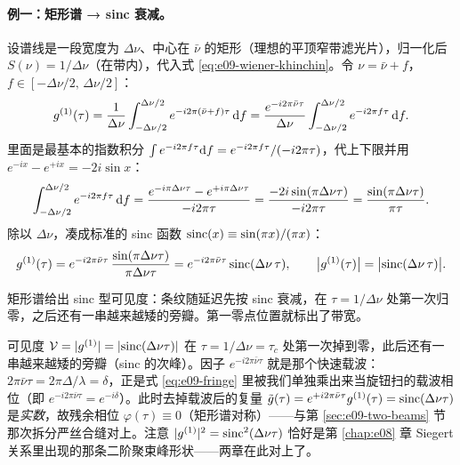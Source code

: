 \paragraph{例一：矩形谱 → sinc 衰减。}设谱线是一段宽度为 \(\Delta\nu\)、中心在 \(\bar\nu\) 的矩形（理想的平顶窄带滤光片），归一化后 \(S(\nu)=1/\Delta\nu\)（在带内），代入式 \eqref{eq:e09-wiener-khinchin}。令 \(\nu=\bar\nu+f\)，\(f\in[-\Delta\nu/2,\,\Delta\nu/2]\)：
\[
  g^{(1)}(\tau)=\frac{1}{\Delta\nu}\int_{-\Delta\nu/2}^{\Delta\nu/2}
  e^{-i2\pi(\bar\nu+f)\tau}\,{\rm d}f
  =\frac{e^{-i2\pi\bar\nu\tau}}{\Delta\nu}
  \int_{-\Delta\nu/2}^{\Delta\nu/2}e^{-i2\pi f\tau}\,{\rm d}f .
\]
里面是最基本的指数积分 \(\int e^{-i2\pi f\tau}{\rm d}f=e^{-i2\pi f\tau}/(-i2\pi\tau)\)，代上下限并用 \(e^{-ix}-e^{+ix}=-2i\sin x\)：
\[
  \int_{-\Delta\nu/2}^{\Delta\nu/2}e^{-i2\pi f\tau}\,{\rm d}f
  =\frac{e^{-i\pi\Delta\nu\tau}-e^{+i\pi\Delta\nu\tau}}{-i2\pi\tau}
  =\frac{-2i\sin(\pi\Delta\nu\tau)}{-i2\pi\tau}
  =\frac{\sin(\pi\Delta\nu\tau)}{\pi\tau} .
\]
除以 \(\Delta\nu\)，凑成标准的 sinc 函数 \({\rm sinc}(x)\equiv\sin(\pi x)/(\pi x)\)：
\begin{equation}
  g^{(1)}(\tau)=e^{-i2\pi\bar\nu\tau}\,\frac{\sin(\pi\Delta\nu\tau)}{\pi\Delta\nu\tau}
  =e^{-i2\pi\bar\nu\tau}\,{\rm sinc}(\Delta\nu\,\tau),
  \qquad
  \big|g^{(1)}(\tau)\big|=\big|{\rm sinc}(\Delta\nu\,\tau)\big| .
  \label{eq:e09-rect-sinc}
\end{equation}
\begin{formulaexplain}
矩形谱给出 sinc 型可见度：条纹随延迟先按 sinc 衰减，在 \(\tau=1/\Delta\nu\) 处第一次归零，之后还有一串越来越矮的旁瓣。第一零点位置就标出了带宽。
\end{formulaexplain}
可见度 \(\mathcal V=|g^{(1)}|=|{\rm sinc}(\Delta\nu\tau)|\) 在 \(\tau=1/\Delta\nu=\tau_c\) 处第一次掉到零，此后还有一串越来越矮的旁瓣（sinc 的次峰）。因子 \(e^{-i2\pi\bar\nu\tau}\) 就是那个快速载波：\(2\pi\bar\nu\tau=2\pi\Delta/\lambda=\delta\)，正是式 \eqref{eq:e09-fringe} 里被我们单独乘出来当旋钮扫的载波相位（即 \(e^{-i2\pi\bar\nu\tau}=e^{-i\delta}\)）。此时去掉载波后的复量 \(\tilde g(\tau)=e^{+i2\pi\bar\nu\tau}g^{(1)}(\tau)={\rm sinc}(\Delta\nu\tau)\) 是\emph{实数}，故残余相位 \(\varphi(\tau)\equiv0\)（矩形谱对称）——与第 \ref{sec:e09-two-beams} 节那次拆分严丝合缝对上。注意 \(|g^{(1)}|^2={\rm sinc}^2(\Delta\nu\tau)\) 恰好是第 \ref{chap:e08} 章 Siegert 关系里出现的那条二阶聚束峰形状——两章在此对上了。

